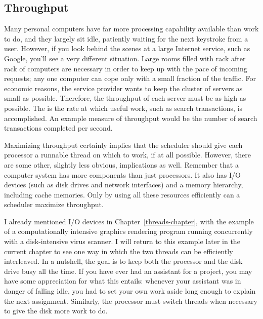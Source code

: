 \subsection{Throughput}\label{throughput-section}
Many personal computers have far more processing capability available
than work to do, and they largely sit idle, patiently waiting for the next
keystroke from a user.  However, if you look behind the scenes at a large
Internet service, such as Google, you'll see a very different
situation.  Large rooms filled with rack after rack of
computers are necessary in order to keep up with the pace of incoming
requests; any one computer can cope only with a small fraction of the
traffic.  For economic reasons, the service provider wants to keep the
cluster of servers as small as possible.  Therefore, the throughput of
each server must be as high as possible.  The  is the rate
at which useful work, such as search transactions, is accomplished.
An example measure of throughput would be the number of search
transactions completed per second.

Maximizing throughput certainly implies that the scheduler should give
each processor a runnable thread on which to work, if at all possible.
However, there are some other, slightly less obvious, implications as
well.  Remember that a computer system has more components than just
processors.  It also has I/O devices (such as disk drives and network
interfaces) and a memory hierarchy, including cache memories.  Only by
using all these resources efficiently can a scheduler maximize
throughput.

I already mentioned I/O devices in Chapter~\ref{threads-chapter}, with the
example of a computationally intensive graphics rendering program
running concurrently with a disk-intensive virus scanner.  I will return
to this example later in the current chapter to see one way in which
the two threads can be efficiently interleaved.  In a nutshell, the
goal is to keep both the processor and the disk drive busy all the
time.  If you have ever had an assistant for a project, you may have some
appreciation for what this entails: whenever your assistant was in danger
of falling idle, you had to set your own work aside long enough to
explain the next assignment.  Similarly, the processor must switch
threads when necessary to give the disk more work to do.

